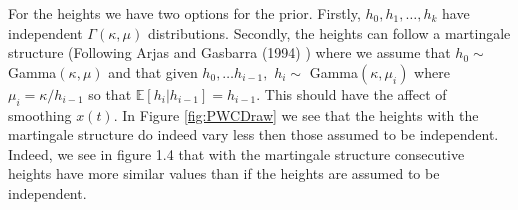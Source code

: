 \documentclass[../main.tex]{subfiles}
\begin{document}
 For the heights we have two options for the prior. Firstly,  $h_0,h_1, \dots, h_k$ have independent $\Gamma (\kappa , \mu ) $ distributions.  Secondly, the heights can follow a martingale structure (Following Arjas and Gasbarra (1994) \cite{Martingale}) where we assume that $h_0 \sim $ Gamma$(\kappa, \mu)$ and that given $h_0, \dots h_{i-1},$ $h_i \sim$ Gamma$(\kappa, \mu_i)$ where $\mu_i = \kappa / h_{i-1}$ so that $\mathbb{E}[h_i | h_{i-1}] = h_{i-1}$. This should have the affect of smoothing $x(t)$. In Figure \ref{fig:PWCDraw} we see that the heights with the martingale structure do indeed vary less then those assumed to be independent.  Indeed, we see in figure 1.4 that with the martingale structure consecutive heights have more similar values than if the heights are assumed to be independent. 

    
\end{document}
